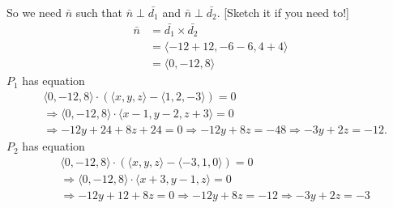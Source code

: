 \documentclass[11pt]{article}
\begin{document}
\begin{enumerate}[label=\alph*), series=Last]
    So we need \(\bar{n}\) such that \(\bar{n} \perp \bar{d_1}\) and \(\bar{n} \perp \bar{d_2}\). \hfill {\color{red} [Sketch it if you need to!]}
    \[
        \begin{aligned}
            \bar{n} &= \bar{d_1} \times \bar{d_2} \\
            &= \langle -12+12,-6-6,4+4 \rangle\\
            &= \langle 0, -12, 8 \rangle
        \end{aligned}
    \]
    \(P_1\) has equation
    \[
        \begin{aligned}
            &\langle 0, -12, 8 \rangle \cdot \left(\langle x,y,z\rangle - \langle 1,2,-3\rangle\right) = 0\\
            &\Rightarrow \langle 0, -12, 8 \rangle \cdot \langle x-1,y-2,z+3\rangle = 0\\
            &\Rightarrow -12y+24+8z+24 = 0 \Rightarrow -12y+8z = -48 \Rightarrow -3y + 2z = -12.
        \end{aligned}
    \]
    \(P_2\) has equation
    \[
        \begin{aligned}
            &\langle 0, -12, 8 \rangle \cdot \left(\langle x,y,z\rangle - \langle -3,1,0\rangle\right) = 0\\
            &\Rightarrow \langle 0, -12, 8 \rangle \cdot \langle x+3, y-1, z \rangle = 0\\
            &\Rightarrow -12y +12 +8z = 0 \Rightarrow -12y + 8z = -12 \Rightarrow -3y + 2z = -3
        \end{aligned}
    \]
    \color{black}
\end{enumerate}

\newpage
\end{document}
